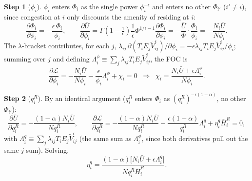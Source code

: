 \documentclass[12pt, a4paper]{article}
\theoremstyle{definition}
\newtheorem{step}{Step}
\begin{document}
\begin{step}[$\phi_i$] $\phi_i$ enters $\Phi_i$ as the single power $\phi_i^{-\epsilon}$ and enters no other $\Phi_{i'}$ ($i'\neq i$), since congestion at $i$ only discounts the amenity of residing at $i$:
\[
\frac{\partial \Phi_i}{\partial \phi_i} = -\frac{\epsilon\,\Phi_i}{\phi_i}, \qquad
\frac{\partial \bar U}{\partial \phi_i} = \Gamma\!\left(1-\tfrac1\epsilon\right)\frac{1}{\epsilon}\Phi^{1/\epsilon-1}\frac{\partial\Phi_i}{\partial\phi_i}
= -\frac{\bar U}{\Phi}\cdot\frac{\Phi_i}{\phi_i} = -\frac{N_i\bar U}{N\phi_i}.
\]
The $\lambda$-bracket contributes, for each $j$, $\lambda_{ij}\,\partial(T_iE_j\tilde V_{ij}^\epsilon)/\partial\phi_i = -\epsilon\lambda_{ij}T_iE_j\tilde V_{ij}^\epsilon/\phi_i$; summing over $j$ and defining $\Lambda_i^\phi\equiv\sum_j\lambda_{ij}T_iE_j\tilde V_{ij}^\epsilon$, the FOC is
\[
\frac{\partial\mathcal L}{\partial\phi_i} = -\frac{N_i\bar U}{N\phi_i} - \frac{\epsilon}{\phi_i}\Lambda_i^\phi + \chi_i = 0 \;\;\Longrightarrow\;\; \chi_i = \frac{N_i\bar U+\epsilon\Lambda_i^\phi}{N\phi_i}.
\]
\end{step}

\begin{step}[$q_i^R$] By an identical argument ($q_i^R$ enters $\Phi_i$ as $(q_i^R)^{-\epsilon(1-\alpha)}$, no other $\Phi_{i'}$):
\[
\frac{\partial \bar U}{\partial q_i^R} = -\frac{(1-\alpha)N_i\bar U}{Nq_i^R}, \qquad
\frac{\partial\mathcal L}{\partial q_i^R} = -\frac{(1-\alpha)N_i\bar U}{Nq_i^R} - \frac{\epsilon(1-\alpha)}{q_i^R}\Lambda_i^q + \eta_i^q\bar H_i^R = 0,
\]
with $\Lambda_i^q\equiv\sum_j\lambda_{ij}T_iE_j\tilde V_{ij}^\epsilon$ (the same sum as $\Lambda_i^\phi$, since both derivatives pull out the same $j$-sum). Solving,
\[
\eta_i^q = \frac{(1-\alpha)\bigl[N_i\bar U+\epsilon\Lambda_i^q\bigr]}{Nq_i^R\bar H_i^R}.
\]
\end{step}
\end{document}
